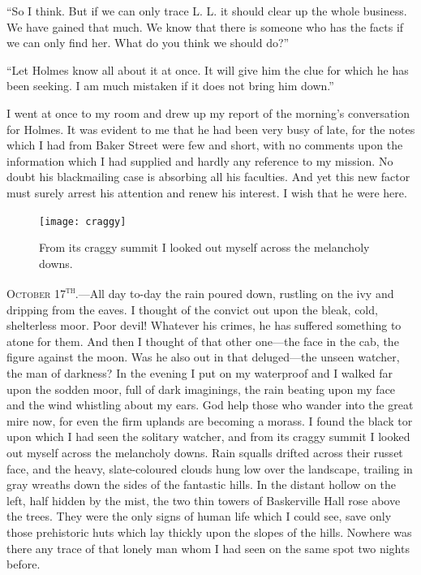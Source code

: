 \documentclass[paper=a5,BCOR=7mm,twoside,DIV=calc,12pt,usegeometry,openany,chapterprefix,endperiod,headings=big]{scrbook} %
\begin{document}
\enquote{So I think. But if we can only trace L. L. it should clear up the whole business. We have gained that much. We know that there is someone who has the facts if we can only find her. What do you think we should do?}

\enquote{Let Holmes know all about it at once. It will give him the clue for which he has been seeking. I am much mistaken if it does not bring him down.}

I went at once to my room and drew up my report of the morning's conversation for Holmes. It was evident to me that he had been very busy of late, for the notes which I had from Baker Street were few and short, with no comments upon the information which I had supplied and hardly any reference to my mission. No doubt his blackmailing case is absorbing all his faculties. And yet this new factor must surely arrest his attention and renew his interest. I wish that he were here.

\begin{figure}[p!h]
\centering
\texttt{[image: craggy]}
\caption{From its craggy summit I looked out myself across the melancholy downs.}
\end{figure}


\textsc{October 17\textsuperscript{th}.}---All day to-day the rain poured down, rustling on the ivy and dripping from the eaves. I thought of the convict out upon the bleak, cold, shelterless moor. Poor devil! Whatever his crimes, he has suffered something to atone for them. And then I thought of that other one---the face in the cab, the figure against the moon. Was he also out in that deluged---the unseen watcher, the man of darkness? In the evening I put on my waterproof and I walked far upon the sodden moor, full of dark imaginings, the rain beating upon my face and the wind whistling about my ears. God help those who wander into the great mire now, for even the firm uplands are becoming a morass. I found the black tor upon which I had seen the solitary watcher, and from its craggy summit I looked out myself across the melancholy downs. Rain squalls drifted across their russet face, and the heavy, slate-coloured clouds hung low over the landscape, trailing in gray wreaths down the sides of the fantastic hills. In the distant hollow on the left, half hidden by the mist, the two thin towers of Baskerville Hall rose above the trees. They were the only signs of human life which I could see, save only those prehistoric huts which lay thickly upon the slopes of the hills. Nowhere was there any trace of that lonely man whom I had seen on the same spot two nights before.
\end{document}
